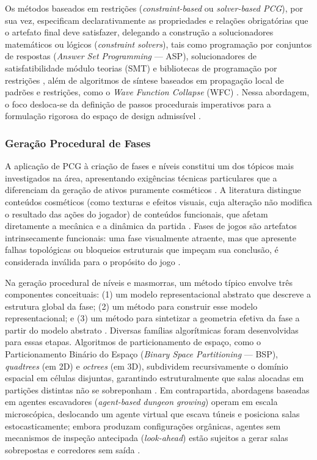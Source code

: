 Os métodos baseados em restrições (\textit{constraint-based} ou \textit{solver-based PCG}), por sua vez, especificam declarativamente as propriedades e relações obrigatórias que o artefato final deve satisfazer, delegando a construção a solucionadores matemáticos ou lógicos (\textit{constraint solvers}), tais como programação por conjuntos de respostas (\textit{Answer Set Programming} --- ASP), solucionadores de satisfatibilidade módulo teorias (SMT) e bibliotecas de programação por restrições \cite{tanagra, linden2014dungeons, pcgbook, summerville2018procedural, chen2025narrative}, além de algoritmos de síntese baseados em propagação local de padrões e restrições, como o \textit{Wave Function Collapse} (WFC) \cite{maleki2024procedural}. Nessa abordagem, o foco desloca-se da definição de passos procedurais imperativos para a formulação rigorosa do espaço de design admissível \cite{tanagra, linden2014dungeons}.

\subsubsection{Geração Procedural de Fases}
\label{sec:pcg_fases}

A aplicação de PCG à criação de fases e níveis constitui um dos tópicos mais investigados na área, apresentando exigências técnicas particulares que a diferenciam da geração de ativos puramente cosméticos \cite{summerville2018procedural, maleki2024procedural}. A literatura distingue conteúdos cosméticos (como texturas e efeitos visuais, cuja alteração não modifica o resultado das ações do jogador) de conteúdos funcionais, que afetam diretamente a mecânica e a dinâmica da partida \cite{summerville2018procedural}. Fases de jogos são artefatos intrinsecamente funcionais: uma fase visualmente atraente, mas que apresente falhas topológicas ou bloqueios estruturais que impeçam sua conclusão, é considerada inválida para o propósito do jogo \cite{summerville2018procedural, linden2014dungeons}.

Na geração procedural de níveis e masmorras, um método típico envolve três componentes conceituais: (1) um modelo representacional abstrato que descreve a estrutura global da fase; (2) um método para construir esse modelo representacional; e (3) um método para sintetizar a geometria efetiva da fase a partir do modelo abstrato \cite{linden2014dungeons, shaker2016constructive}. Diversas famílias algorítmicas foram desenvolvidas para essas etapas. Algoritmos de particionamento de espaço, como o Particionamento Binário do Espaço (\textit{Binary Space Partitioning} --- BSP), \textit{quadtrees} (em 2D) e \textit{octrees} (em 3D), subdividem recursivamente o domínio espacial em células disjuntas, garantindo estruturalmente que salas alocadas em partições distintas não se sobreponham \cite{shaker2016constructive}. Em contrapartida, abordagens baseadas em agentes escavadores (\textit{agent-based dungeon growing}) operam em escala microscópica, deslocando um agente virtual que escava túneis e posiciona salas estocasticamente; embora produzam configurações orgânicas, agentes sem mecanismos de inspeção antecipada (\textit{look-ahead}) estão sujeitos a gerar salas sobrepostas e corredores sem saída \cite{shaker2016constructive}.

